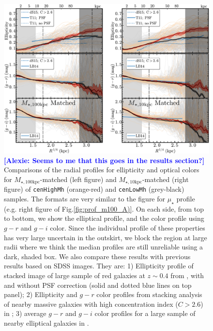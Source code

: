 \documentclass{emulateapj}
\def\rbcg{\texttt{cenHighMh}}
\def\nbcg{\texttt{cenLowMh}}
\def\minn{{$M_{\star,10\mathrm{kpc}}$}}
\def\mtot{{$M_{\star,100\mathrm{kpc}}$}}
\def\mden{{$\mu_{\star}$}}
\newcommand{\alexie}[1]{\textcolor{blue}{\textbf{[Alexie: #1]}}}
\begin{document}
\begin{CJK*}{UTF8}{gbsn}
  \begin{figure}[t!]
      \centering 
      \includegraphics[width=17.0cm]{fig/redbcg_discussion_2}
      \caption{\alexie{Seems to me that this goes in the results section?} Comparisons of the radial profiles for ellipticity and optical colors 
      	for \mtot{}-matched (left figure) and \minn{}-matched (right figure) of 
        \rbcg{} (orange-red) and \nbcg{} (grey-black) samples. 
        The formats are very similar to the figure for \mden{} profile 
        (e.g. right figure of Fig.\ref{fig:prof_m100_A)}. 
        On each side, from top to bottom, we show the elliptical profile, and the 
        color profile using $g-r$ and $g-i$ color. 
        Since the individual profile of these properties has very large uncertain in the 
        outskirt, we block the region at large radii where we think the median profiles 
        are still unreliable using a dark, shaded box.
        We also compare these results with previous results based on SDSS images. 
        They are: 
        1) Ellipticity profile of stacked image of large sample of red galaxies at 
        $z\sim 0.4$ from \citet{Tal2011}, with and without PSF correction 
        (solid and dotted blue lines on top panel); 
        2) Ellipticity and $g-r$ color profiles from stacking analysis of nearby massive 
        galaxies with high concentration index ($C>2.6$) in \citet[][blue dash lines 
        on the top and middle panels]{DSouza2014}; 
        3) average $g-r$ and $g-i$ color profiles for a large sample of nearby 
        elliptical galaxies in \citet[][blue, solid lines on the middle and bottom 
        panels]{LaBarbera2010}.}
      \label{fig:discussion_2}
  \end{figure}
   

\end{CJK*}
\end{document}
